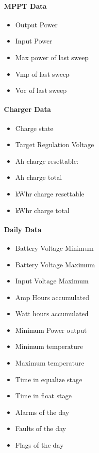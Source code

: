 \paragraph{MPPT Data}
\begin{itemize}
	\item Output Power
	\item Input Power
	\item Max power of last sweep
	\item Vmp of last sweep
	\item Voc of last sweep
\end{itemize}
\par

\paragraph{Charger Data}
\begin{itemize}
	\item Charge state
	\item Target Regulation Voltage
	\item Ah charge resettable:
	\item Ah charge total
	\item kWhr charge resettable
	\item kWhr charge total
\end{itemize}
\par

\paragraph{Daily Data}
\begin{itemize}
	\item Battery Voltage Minimum
	\item Battery Voltage Maximum
	\item Input Voltage Maximum
	\item Amp Hours accumulated
	\item Watt hours accumulated
	\item Minimum Power output
	\item Minimum temperature
	\item Maximum temperature
	\item Time in equalize stage
	\item Time in float stage
	\item Alarms of the day
	\item Faults of the day
	\item Flags of the day
\end{itemize}
\par

